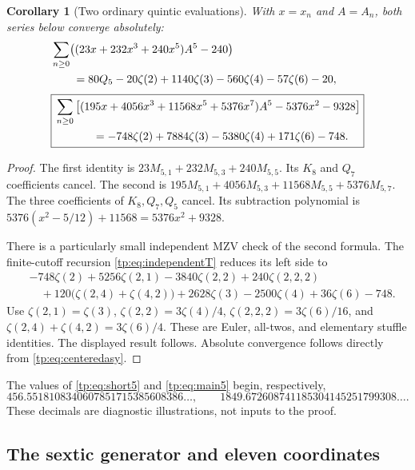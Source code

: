 \documentclass[11pt,a4paper]{article}
\numberwithin{equation}{section}
\newtheorem{corollary}[theorem]{Corollary}
\theoremstyle{definition}
\theoremstyle{remark}
\begin{document}
\begin{corollary}[Two ordinary quintic evaluations]
\label{tp:cor:explicit}
With $x=x_n$ and $A=A_n$, both series below converge absolutely:
\begin{align}
 &\sum_{n\geq0}\bigl((23x+232x^3+240x^5)A^5-240\bigr)\notag\\
 &\qquad=80Q_5-20\zeta(2)+1140\zeta(3)-560\zeta(4)
                         -57\zeta(6)-20,\label{tp:eq:short5}\\[3pt]
 &\boxed{\begin{aligned}
 &\sum_{n\geq0}\left[
 (195x+4056x^3+11568x^5+5376x^7)A^5
                  -5376x^2-9328\right]\\
 &\hspace{12mm}=-748\zeta(2)+7884\zeta(3)-5380\zeta(4)
                  +171\zeta(6)-748.
 \end{aligned}}\label{tp:eq:main5}
\end{align}
\end{corollary}

\begin{proof}
The first identity is $23M_{5,1}+232M_{5,3}+240M_{5,5}$.
Its $K_8$ and $Q_7$ coefficients cancel.  The second is
$195M_{5,1}+4056M_{5,3}+11568M_{5,5}+5376M_{5,7}$.
The three coefficients of $K_8,Q_7,Q_5$ cancel.  Its subtraction
polynomial is $5376(x^2-5/12)+11568=5376x^2+9328$.

There is a particularly small independent MZV check of the second
formula.  The finite-cutoff recursion \eqref{tp:eq:independentT}
reduces its left side to
\begin{align*}
 &-748\zeta(2)+5256\zeta(2,1)-3840\zeta(2,2)
   +240\zeta(2,2,2)\\
 &\quad+120\bigl(\zeta(2,4)+\zeta(4,2)\bigr)
   +2628\zeta(3)-2500\zeta(4)+36\zeta(6)-748.
\end{align*}
Use $\zeta(2,1)=\zeta(3)$,
$\zeta(2,2)=3\zeta(4)/4$,
$\zeta(2,2,2)=3\zeta(6)/16$, and
$\zeta(2,4)+\zeta(4,2)=3\zeta(6)/4$.
These are Euler, all-twos, and elementary stuffle identities.
The displayed result follows.  Absolute convergence follows directly
from \eqref{tp:eq:centeredasy}.
\end{proof}

The values of \eqref{tp:eq:short5} and \eqref{tp:eq:main5} begin,
respectively,
\[
 456.5518108340607851715385608386\ldots,
 \qquad1849.672608741185304145251799308\ldots.
\]
These decimals are diagnostic illustrations, not inputs to the proof.

\subsection{The sextic generator and eleven coordinates}
\end{document}
